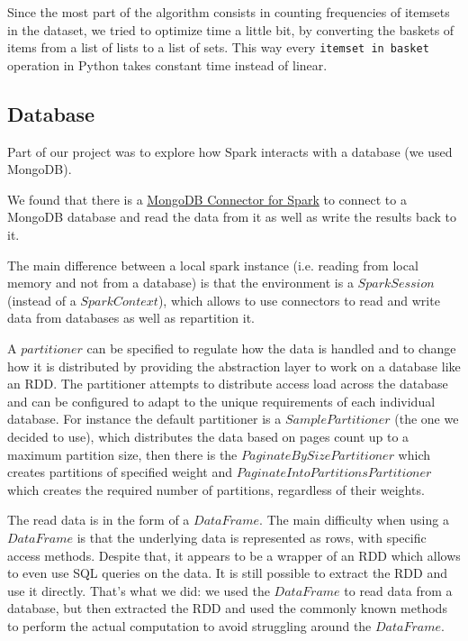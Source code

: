 \documentclass[a4paper]{article}
\begin{document}
	Since the most part of the algorithm consists in counting frequencies of itemsets in the dataset, we tried to optimize time a little bit, by converting the baskets of items from a list of lists to
	a list of sets. This way every \texttt{itemset in basket} operation in Python takes constant time instead of linear.\\

	\subsection{Database}
	\label{section:database}
	Part of our project was to explore how Spark interacts with a database (we used MongoDB).
	
	We found that there is a \href{https://www.mongodb.com/docs/spark-connector/current/}{MongoDB Connector for Spark} to connect to a MongoDB database and read the data from it as well as write the results back to it.
	
	The main difference between a local spark instance (i.e. reading from local memory and not from a database) is that the environment is a $SparkSession$ (instead of a $SparkContext$), which allows to use connectors 
	to read and write data from databases as well as repartition it.

	A $partitioner$ can be specified to regulate how the data is handled and to change how it is distributed by providing the abstraction layer to work on a database like an RDD. 
	The partitioner attempts to distribute access load across the database and can be configured to adapt to the unique requirements of each individual database. For instance the default partitioner is a $SamplePartitioner$ (the one we decided to use), which
	distributes the data based on pages count up to a maximum partition size, then there is the $PaginateBySizePartitioner$ which creates partitions of specified weight and $PaginateIntoPartitionsPartitioner$
	which creates the required number of partitions, regardless of their weights.

	The read data is in the form of a $DataFrame$. The main difficulty when using a $DataFrame$ is that the underlying data is represented as rows, with specific access methods. Despite that, it appears 
	to be a wrapper of an RDD which allows to even use SQL queries on the data. It is still possible to extract the RDD and use it directly. That's what we did: we used the $DataFrame$ to read data from a database, but then extracted the RDD and used the commonly known methods to perform the actual computation to avoid struggling around
	the $DataFrame$.
\end{document}
